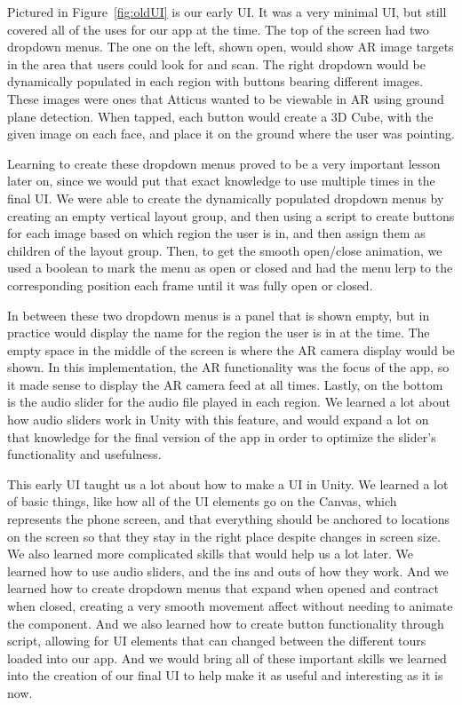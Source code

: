 \documentclass[a4paper, 10pt, american, titlepage]{article}
\begin{document}
Pictured in Figure~\ref{fig:oldUI} is our early UI. It was a very minimal UI,
but still covered all of the uses for our app at the time. The top of the 
screen had two dropdown menus. The one on the left, shown open, would
show AR image targets in the area that users could look for and scan. The right
dropdown would be dynamically populated in each region with buttons bearing  
different images. These images were ones that Atticus wanted to be viewable in AR using ground plane
detection. When tapped, each button would create a 3D Cube, with the given image
on each face, and place it on the ground where the user was pointing. 

Learning to create these dropdown menus proved to be a very important lesson
later on, since we would put that exact knowledge to use multiple times in the
final UI. We were able to create the dynamically populated dropdown menus by 
creating an empty vertical layout group, and then using a script to create
buttons for each image based on which region the user is in, and then assign
them as children of the layout group. Then, to get the smooth open/close animation,
we used a boolean to mark the menu as open or closed and had the menu lerp to the
corresponding position each frame until it was fully open or closed.  

In between these two dropdown menus is a panel that is shown empty, but in practice would
display the name for the region the user is in at the time. The empty space
in the middle of the screen is where the AR camera display would be shown. In this 
implementation, the AR functionality was the focus of the app, so it made sense
to display the AR camera feed at all times. Lastly, on the bottom is the audio slider for the audio file played in each region. 
We learned a lot about how audio sliders work in Unity with this feature, and would
expand a lot on that knowledge for the final version of the app in order to optimize
the slider's functionality and usefulness.

This early UI taught us a lot about how to make a UI in Unity. We learned a lot of 
basic things, like how all of the UI elements go on the Canvas, which represents
the phone screen, and that everything should be anchored to locations on the screen
so that they stay in the right place despite changes in screen size. 
We also learned more complicated skills that would help us a lot later. We learned
how to use audio sliders, and the ins and outs of how they work. And we learned
how to create dropdown menus that expand when opened and contract when closed, 
creating a very smooth movement affect without needing to animate the component. 
And we also learned how to create button functionality through script, allowing
for UI elements that can changed between the different tours loaded into our app.
And we would bring all of these important skills we learned into the creation
of our final UI to help make it as useful and interesting as it is now.
\end{document}
